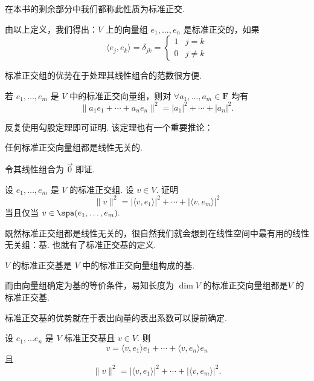 在本书的剩余部分中我们都称此性质为标准正交.

由以上定义，我们得出：$ V $ 上的向量组 $ e_1, \ldots , e_n $ 是标准正交的，如果
\[ \langle e_j, e_k \rangle = \delta _{jk} = \begin{cases}
        1 & j = k    \\
        0 & j \neq k
    \end{cases} \]

标准正交组的优势在于处理其线性组合的范数很方便.

\begin{theorem}
    若 $e_1, \ldots , e_m$ 是 $ V $ 中的标准正交向量组，则对 $\forall a_1, \ldots, a_m \in \mathbf{F}$ 均有
    \[ \lVert a_1e_1 + \cdots + a_ne_n\rVert^2 = \lvert a_1 \rvert^2 + \cdots + \lvert a_n \rvert^2.\]
\end{theorem}

反复使用勾股定理即可证明. 该定理也有一个重要推论：

\begin{theorem}
    任何标准正交向量组都是线性无关的.
\end{theorem}

令其线性组合为 $ \vec{0} $ 即证.

\begin{example} \label{ex:22:标准正交组}
    设 $e_1, \ldots , e_m$ 是 $ V $ 的标准正交组. 设 $ v \in V $. 证明
    \[ \lVert v \rVert^2 = \lvert \langle v, e_1\rangle \rvert^2 + \cdots + \lvert \langle v, e_m\rangle \rvert^2 \]
    当且仅当 $ v \in \spa(e_1, \ldots , e_m).$
\end{example}

既然标准正交组都是线性无关的，很自然我们就会想到在线性空间中最有用的线性无关组：基. 也就有了标准正交基的定义.

\begin{definition}
    $ V $ 的标准正交基是 $ V $ 中的标准正交向量组构成的基.
\end{definition}

而由向量组确定为基的等价条件，易知长度为 $\dim V$ 的标准正交向量组都是$ V $ 的标准正交基.

标准正交基的优势就在于表出向量的表出系数可以提前确定.

\begin{theorem}
    设 $e_1, \ldots e_n$ 是 $ V $ 标准正交基且 $ v \in V$. 则
    \begin{equation} \label{eq:23:Fourier展开}
        v = \langle v, e_1 \rangle e_1 + \cdots + \langle v, e_n \rangle e_n
    \end{equation}
    且
    \[ \lVert v \rVert^2 = \lvert \langle v, e_1\rangle \rvert^2 + \cdots + \lvert \langle v, e_m\rangle \rvert^2. \]
\end{theorem}

